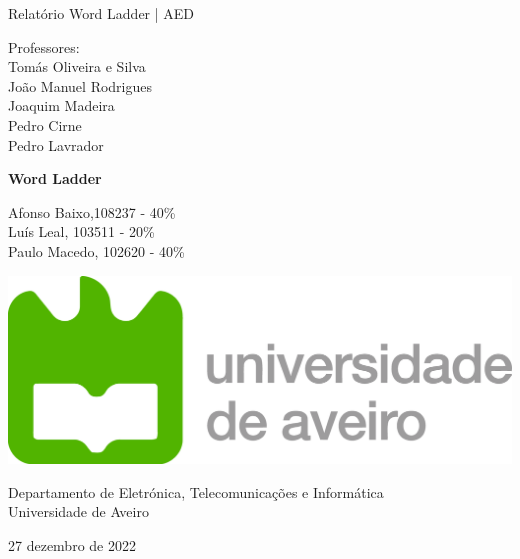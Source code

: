 
\begin{titlepage}
	\clearpage\thispagestyle{empty}
	\centering
	\vspace{2cm}

	
	{\Large Relatório Word Ladder | AED \par}
	\vspace{0.5cm}
	{\small Professores: \\
	Tomás Oliveira e Silva \\
	João Manuel Rodrigues \\
	Joaquim Madeira \\
	Pedro Cirne \\
	Pedro Lavrador\\
	
	\par}
	\vspace{4cm}
	{\Huge \textbf{Word Ladder}} \\
	\vspace{1cm}
	\vspace{4cm}
	{\normalsize Afonso Baixo,108237 - 40\% \\ 
	             Luís Leal, 103511 - 20\% \\ 
	             Paulo Macedo, 102620 - 40\% \par}
	\vspace{2cm}

    \includegraphics[scale=0.10]{ua.png}
    
    \vspace{2cm}
    
	{\normalsize Departamento de Eletrónica, Telecomunicações e Informática \\ 
		Universidade de Aveiro \par}
		
	{\normalsize 27 dezembro de 2022 \par}
	\vspace{2cm}
	
	\pagebreak

\end{titlepage}